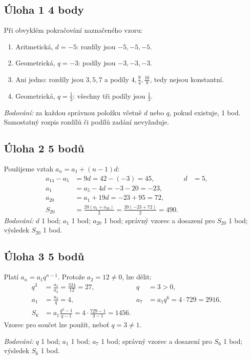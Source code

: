 \documentclass[a4paper,11pt]{article}
\begin{document}
\subsection*{Úloha 1 \hfill 4 body}
Při obvyklém pokračování naznačeného vzoru:
\begin{enumerate}[label=\alph*)]
    \item Aritmetická, $d=-5$: rozdíly jsou $-5,-5,-5$.
    \item Geometrická, $q=-3$: podíly jsou $-3,-3,-3$.
    \item Ani jedno: rozdíly jsou $3,5,7$ a podíly
    $4,\frac94,\frac{16}{9}$, tedy nejsou konstantní.
    \item Geometrická, $q=\frac13$: všechny tři podíly jsou $\frac13$.
\end{enumerate}
\textit{Bodování:} za každou správnou položku včetně $d$ nebo $q$, pokud
existuje, 1 bod. Samostatný rozpis rozdílů či podílů zadání nevyžaduje.

\subsection*{Úloha 2 \hfill 5 bodů}
Použijeme vztah $a_n=a_1+(n-1)d$:
\begin{align*}
    a_{14}-a_5&=9d=42-(-3)=45, & d&=5,\\
    a_1&=a_5-4d=-3-20=-23,\\
    a_{20}&=a_1+19d=-23+95=72,\\
    S_{20}&=\frac{20(a_1+a_{20})}{2}
    =\frac{20(-23+72)}2=490.
\end{align*}
\textit{Bodování:} $d$ 1 bod; $a_1$ 1 bod; $a_{20}$ 1 bod;
správný vzorec a dosazení pro $S_{20}$ 1 bod; výsledek $S_{20}$ 1 bod.

\subsection*{Úloha 3 \hfill 5 bodů}
Platí $a_n=a_1q^{n-1}$. Protože $a_2=12\ne0$, lze dělit:
\begin{align*}
    q^3&=\frac{a_5}{a_2}=\frac{324}{12}=27, & q&=3>0,\\
    a_1&=\frac{a_2}{q}=4, & a_7&=a_1q^6=4\cdot729=2916,\\
    S_6&=a_1\frac{q^6-1}{q-1}
    =4\cdot\frac{729-1}{3-1}=1456.
\end{align*}
Vzorec pro součet lze použít, neboť $q=3\ne1$.

\textit{Bodování:} $q$ 1 bod; $a_1$ 1 bod; $a_7$ 1 bod;
správný vzorec a dosazení pro $S_6$ 1 bod; výsledek $S_6$ 1 bod.
\end{document}
